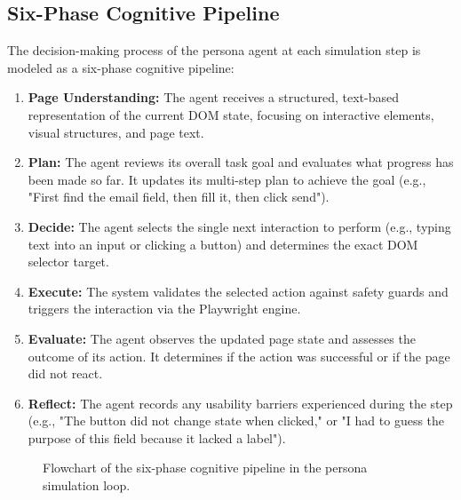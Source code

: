 \subsection{Six-Phase Cognitive Pipeline}
\label{sec:cognitive-pipeline}

The decision-making process of the persona agent at each simulation step is modeled as a six-phase cognitive pipeline:
\begin{enumerate}
    \item \textbf{Page Understanding:} The agent receives a structured, text-based representation of the current DOM state, focusing on interactive elements, visual structures, and page text.
    \item \textbf{Plan:} The agent reviews its overall task goal and evaluates what progress has been made so far. It updates its multi-step plan to achieve the goal (e.g., "First find the email field, then fill it, then click send").
    \item \textbf{Decide:} The agent selects the single next interaction to perform (e.g., typing text into an input or clicking a button) and determines the exact DOM selector target.
    \item \textbf{Execute:} The system validates the selected action against safety guards and triggers the interaction via the Playwright engine.
    \item \textbf{Evaluate:} The agent observes the updated page state and assesses the outcome of its action. It determines if the action was successful or if the page did not react.
    \item \textbf{Reflect:} The agent records any usability barriers experienced during the step (e.g., "The button did not change state when clicked," or "I had to guess the purpose of this field because it lacked a label").
\end{enumerate}

\begin{figure}[htbp]
  \centering
  \caption{Flowchart of the six-phase cognitive pipeline in the persona simulation loop.}
  \label{fig:persona-loop}
\end{figure}

